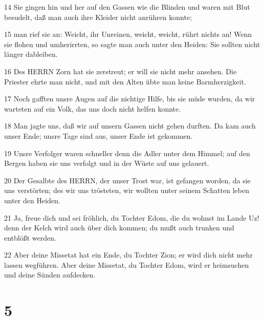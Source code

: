\par 14 Sie gingen hin und her auf den Gassen wie die Blinden und waren mit Blut besudelt, daß man auch ihre Kleider nicht anrühren konnte;
\par 15 man rief sie an: Weicht, ihr Unreinen, weicht, weicht, rührt nichts an! Wenn sie flohen und umherirrten, so sagte man auch unter den Heiden: Sie sollten nicht länger dableiben.
\par 16 Des HERRN Zorn hat sie zerstreut; er will sie nicht mehr ansehen. Die Priester ehrte man nicht, und mit den Alten übte man keine Barmherzigkeit.
\par 17 Noch gafften unsre Augen auf die nichtige Hilfe, bis sie müde wurden, da wir warteten auf ein Volk, das uns doch nicht helfen konnte.
\par 18 Man jagte uns, daß wir auf unsern Gassen nicht gehen durften. Da kam auch unser Ende; unsre Tage sind aus, unser Ende ist gekommen.
\par 19 Unsre Verfolger waren schneller denn die Adler unter dem Himmel; auf den Bergen haben sie uns verfolgt und in der Wüste auf uns gelauert.
\par 20 Der Gesalbte des HERRN, der unser Trost war, ist gefangen worden, da sie uns verstörten; des wir uns trösteten, wir wollten unter seinem Schatten leben unter den Heiden.
\par 21 Ja, freue dich und sei fröhlich, du Tochter Edom, die du wohnst im Lande Uz! denn der Kelch wird auch über dich kommen; du mußt auch trunken und entblößt werden.
\par 22 Aber deine Missetat hat ein Ende, du Tochter Zion; er wird dich nicht mehr lassen wegführen. Aber deine Missetat, du Tochter Edom, wird er heimsuchen und deine Sünden aufdecken.

\chapter{5}

